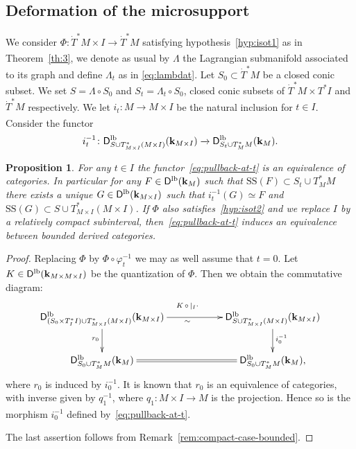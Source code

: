 \documentclass[12pt,leqno]{article}
\newtheorem{proposition}[theorem]{Proposition}
\theoremstyle{definition}
\def\phi{{\varphi}}
\newcommand{\cor}{{\bf k}}
\renewcommand{\to}[1][]{\xrightarrow[]{#1}}
\newcommand{\conv}[1][]{\mathop{\circ}\limits_{#1}}
\newcommand{\opb}[1]{#1^{-1}}
\newcommand{\cl}{\colon}
\newcommand{\eq}{\begin{eqnarray}}
\newcommand{\eneq}{\end{eqnarray}}
\newcommand{\Der}[1][]{\mathsf{D}^{#1}}
\newcommand{\Derlb}{\Der[\mathrm{lb}]}
\newcommand{\SSi}{\mathrm{SS}}
\newcommand{\dT}{{\dot{T}}}
\newcommand{\dTM}{{\dT}^*M}
\numberwithin{equation}{section}
\begin{document}
\subsection{Deformation of the microsupport}
We consider $\Phi\cl \dTM\times I\to \dTM$ satisfying
hypothesis~\eqref{hyp:isot1}
as in Theorem~\ref{th:3}, we denote as usual by $\Lambda$ the
Lagrangian submanifold associated to its graph and define $\Lambda_t$
as in \eqref{eq:lambdat}.
Let $S_0\subset \dTM$ be a closed conic subset. 
We set $S=\Lambda\circ S_0$ and $S_t=\Lambda_t\circ S_0$,
closed conic subsets of  $\dTM\times T^*I$ and  $\dTM$ respectively. 
We let $i_t\cl M\to M\times I$ be
the natural inclusion for $t\in I$. Consider the functor
\eq\label{eq:pullback-at-t}
\opb{i_t} \cl \Derlb_{S\cup T^*_{M\times I}(M\times I)}(\cor_{M\times I})
\to \Derlb_{S_t \cup T^*_MM}(\cor_M).
\eneq
\begin{proposition}\label{pro:famLagr0}
For any $t\in I$ the functor~\eqref{eq:pullback-at-t} is an equivalence
of categories. In particular for any $F\in \Derlb(\cor_M)$ such that
$\SSi(F) \subset S_t\cup T^*_MM$ there exists a unique
$G\in \Derlb(\cor_{M\times I})$ such that $\opb{i_t}(G) \simeq F$ and
$\SSi(G) \subset S\cup T^*_{M\times I}(M\times I)$.
If $\Phi$ also satisfies~\eqref{hyp:isot2} and we replace $I$ by a relatively
compact subinterval, then~\eqref{eq:pullback-at-t} induces an equivalence
between bounded derived categories.
\end{proposition}
\begin{proof}
Replacing $\Phi$ by $\Phi\circ\opb{\phi_t}$ we may as well assume that
 $t=0$.
Let $K\in \Derlb(\cor_{M\times M\times I})$ be the quantization of 
$\Phi$.
Then we obtain the commutative diagram:
$$
\xymatrix@C=2cm{
\Derlb_{(S_0\times T^*_II)\cup T^*_{M\times I}(M\times I)}(\cor_{M\times I})
\ar[r]^{K \conv\vert_I \cdot}_\sim  \ar[d]_{r_0}  
& \Derlb_{S\cup T^*_{M\times I}(M\times I)}(\cor_{M\times I})
 \ar[d]^{\opb{i_0}}  \\
\Derlb_{S_0 \cup T^*_MM}(\cor_M)   \ar@{=}[r] &
\Derlb_{S_0 \cup T^*_MM}(\cor_M)  ,}
$$
where $r_0$ is induced by $\opb{i_0}$.
It is known that $r_0$ is an equivalence of categories, with inverse given by
$\opb{q_1}$, where $q_1\cl M\times I \to M$ is the projection.  Hence so
is the morphism
$\opb{i_0}$ defined by~\eqref{eq:pullback-at-t}.


\medskip\noindent 
The last assertion follows from Remark~\ref{rem:compact-case-bounded}.
\end{proof}
\end{document}

